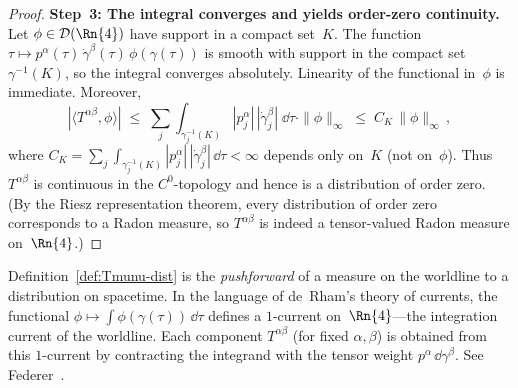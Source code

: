 \begin{proof}
  \medskip\noindent
  \textbf{Step~3: The integral converges and yields
  order-zero continuity.}\;
  Let $\phi \in \mathcal{D}(\Rn{4})$ have
  support in a compact set~$K$.  The function
  $\tau \mapsto p^\alpha(\tau)\,\dot\gamma^\beta(\tau)\,
  \phi(\gamma(\tau))$ is smooth with support in the compact set
  $\gamma^{-1}(K)$, so the integral converges absolutely.
  Linearity of the functional in~$\phi$ is immediate.  Moreover,
  \[
    |\langle T^{\alpha\beta}, \phi\rangle|
      \;\leq\; \sum_j \int_{\gamma_j^{-1}(K)}
        |p_j^\alpha|\,|\dot\gamma_j^\beta|\;\dd\tau
        \cdot \|\phi\|_\infty
      \;\leq\; C_K\,\|\phi\|_\infty\,,
  \]
  where $C_K = \sum_j \int_{\gamma_j^{-1}(K)}
  |p_j^\alpha|\,|\dot\gamma_j^\beta|\,\dd\tau < \infty$ depends
  only on~$K$ (not on~$\phi$).  Thus $T^{\alpha\beta}$ is
  continuous in the $C^0$-topology and hence is a distribution of
  order zero.  (By the Riesz representation theorem, every
  distribution of order zero corresponds to a Radon measure,
  so $T^{\alpha\beta}$ is indeed a tensor-valued Radon measure
  on~$\Rn{4}$.)
\end{proof}

\begin{remark}
  Definition~\ref{def:Tmunu-dist} is the \emph{pushforward} of a
  measure on the worldline to a distribution on spacetime.  In the
  language of de~Rham's theory of currents, the functional
  $\phi \mapsto \int \phi(\gamma(\tau))\,\dd\tau$ defines a
  $1$-current on~$\Rn{4}$---the integration current of the
  worldline.  Each component $T^{\alpha\beta}$ (for fixed
  $\alpha,\beta$) is obtained from this $1$-current by
  contracting the integrand with the tensor weight
  $p^\alpha\,\dd\gamma^\beta$.  See
  Federer~\cite[\S4.1]{Federer69}.
\end{remark}
